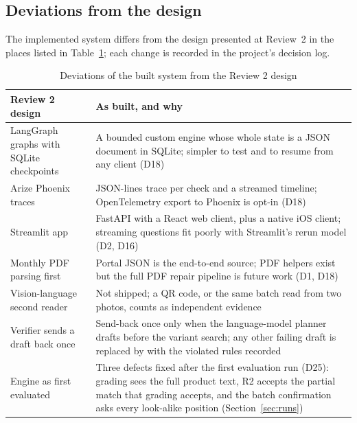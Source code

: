 \subsection{Deviations from the design}
The implemented system differs from the design presented at Review~2 in the places listed in Table~\ref{tab:deviations}; each change is recorded in the project's decision log.

\begin{table}[t]
\centering
\caption{Deviations of the built system from the Review 2 design}
\label{tab:deviations}
\scriptsize
\begin{tabularx}{\columnwidth}{@{}>{\raggedright\arraybackslash}p{24mm} X@{}}
\toprule
Review 2 design & As built, and why \\
\midrule
LangGraph graphs with SQLite checkpoints & A bounded custom engine whose whole state is a JSON document in SQLite; simpler to test and to resume from any client (D18) \\
Arize Phoenix traces & JSON-lines trace per check and a streamed timeline; OpenTelemetry export to Phoenix is opt-in (D18) \\
Streamlit app & FastAPI with a React web client, plus a native iOS client; streaming questions fit poorly with Streamlit's rerun model (D2, D16) \\
Monthly PDF parsing first & Portal JSON is the end-to-end source; PDF helpers exist but the full PDF repair pipeline is future work (D1, D18) \\
Vision-language second reader & Not shipped; a QR code, or the same batch read from two photos, counts as independent evidence \\
Verifier sends a draft back once & Send-back once only when the language-model planner drafts before the variant search; any other failing draft is replaced by \CANTV{} with the violated rules recorded \\
Engine as first evaluated & Three defects fixed after the first evaluation run (D25): grading sees the full product text, R2 accepts the partial match that grading accepts, and the batch confirmation asks every look-alike position (Section~\ref{sec:runs}) \\
\bottomrule
\end{tabularx}
\end{table}

